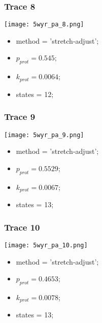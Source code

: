 \subsubsection{Trace 8}
\begin{minipage}[c]{0.7\textwidth}
    \texttt{[image: 5wyr\_pa\_8.png]}
\end{minipage}
\hfill
\begin{minipage}[c]{0.45\textwidth}
    \begin{itemize}
        \item method = 'stretch-adjust';
        \item $p_{prot}=0.545$;
        \item $k_{prot}=0.0064$;
        \item states = 12;
    \end{itemize}
\end{minipage}

\subsubsection{Trace 9}
\begin{minipage}[c]{0.7\textwidth}
    \texttt{[image: 5wyr\_pa\_9.png]}
\end{minipage}
\hfill
\begin{minipage}[c]{0.45\textwidth}
    \begin{itemize}
        \item method = 'stretch-adjust';
        \item $p_{prot}=0.5529$;
        \item $k_{prot}=0.0067$;
        \item states = 13;
    \end{itemize}
\end{minipage}

\subsubsection{Trace 10}
\begin{minipage}[c]{0.7\textwidth}
    \texttt{[image: 5wyr\_pa\_10.png]}
\end{minipage}
\hfill
\begin{minipage}[c]{0.45\textwidth}
    \begin{itemize}
        \item method = 'stretch-adjust';
        \item $p_{prot}=0.4653$;
        \item $k_{prot}=0.0078$;
        \item states = 13;
    \end{itemize}
\end{minipage}

